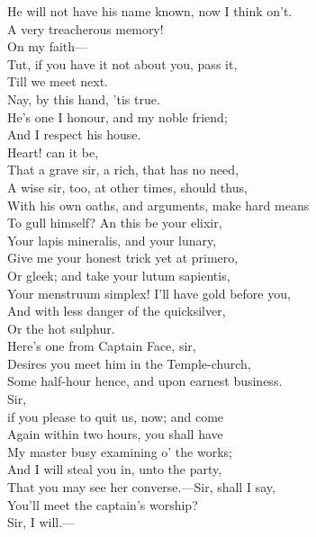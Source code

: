 \documentclass[a4paper,oneside]{memoir}
\begin{document}
\begin{drama*}
He will not have his name known, now I think on't.\\
\surlyspeaks A very treacherous memory!\\
\mammonspeaks {} On my faith---\\
\surlyspeaks Tut, if you have it not about you, pass it,\\
Till we meet next.\\
\mammonspeaks {} Nay, by this hand, 'tis true.\\
He's one I honour, and my noble friend;\\
And I respect his house.\\
\surlyspeaks {} Heart! can it be,\\
That a grave sir, a rich, that has no need,\\
A wise sir, too, at other times, should thus,\\
With his own oaths, and arguments, make hard means\\
To gull himself? An this be your elixir,\\
Your lapis mineralis, and your lunary,\\
Give me your honest trick yet at primero,\\
Or gleek; and take your lutum sapientis,\\
Your menstruum simplex! I'll have gold before you,\\
And with less danger of the quicksilver,\\
Or the hot sulphur.\\
\facespeaks {} Here's one from Captain Face, sir,\\
Desires you meet him in the Temple-church,\\
Some half-hour hence, and upon earnest business.\\
Sir,\\
if you please to quit us, now; and come\\
Again within two hours, you shall have\\
My master busy examining o' the works;\\
And I will steal you in, unto the party,\\
That you may see her converse.---Sir, shall I say,\\
You'll meet the captain's worship?\\
\surlyspeaks {} Sir, I will.---\\

\end{drama*}
\end{document}
